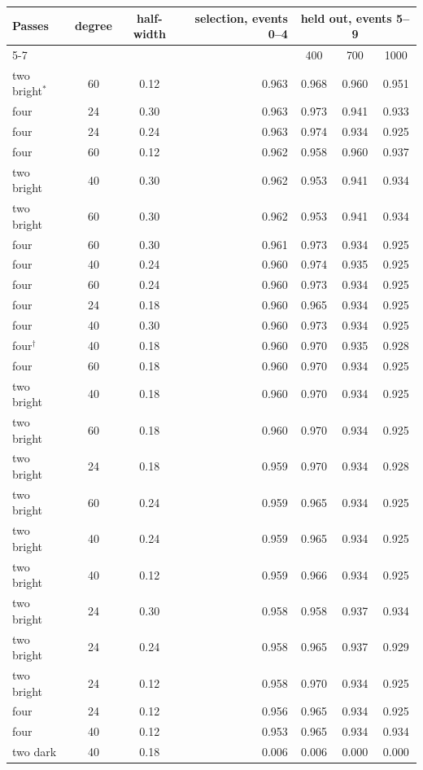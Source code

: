\begin{tabular}{lccrccc}\toprule
Passes & degree & half-width & selection, events 0--4 & \multicolumn{3}{c}{held out, events 5--9}\\
\cmidrule(lr){5-7}
 & & & & 400 & 700 & 1000\\\midrule
two bright$^\ast$ & 60 & 0.12 & 0.963 & 0.968 & 0.960 & 0.951\\
four & 24 & 0.30 & 0.963 & 0.973 & 0.941 & 0.933\\
four & 24 & 0.24 & 0.963 & 0.974 & 0.934 & 0.925\\
four & 60 & 0.12 & 0.962 & 0.958 & 0.960 & 0.937\\
two bright & 40 & 0.30 & 0.962 & 0.953 & 0.941 & 0.934\\
two bright & 60 & 0.30 & 0.962 & 0.953 & 0.941 & 0.934\\
four & 60 & 0.30 & 0.961 & 0.973 & 0.934 & 0.925\\
four & 40 & 0.24 & 0.960 & 0.974 & 0.935 & 0.925\\
four & 60 & 0.24 & 0.960 & 0.973 & 0.934 & 0.925\\
four & 24 & 0.18 & 0.960 & 0.965 & 0.934 & 0.925\\
four & 40 & 0.30 & 0.960 & 0.973 & 0.934 & 0.925\\
four$^\dagger$ & 40 & 0.18 & 0.960 & 0.970 & 0.935 & 0.928\\
four & 60 & 0.18 & 0.960 & 0.970 & 0.934 & 0.925\\
two bright & 40 & 0.18 & 0.960 & 0.970 & 0.934 & 0.925\\
two bright & 60 & 0.18 & 0.960 & 0.970 & 0.934 & 0.925\\
two bright & 24 & 0.18 & 0.959 & 0.970 & 0.934 & 0.928\\
two bright & 60 & 0.24 & 0.959 & 0.965 & 0.934 & 0.925\\
two bright & 40 & 0.24 & 0.959 & 0.965 & 0.934 & 0.925\\
two bright & 40 & 0.12 & 0.959 & 0.966 & 0.934 & 0.925\\
two bright & 24 & 0.30 & 0.958 & 0.958 & 0.937 & 0.934\\
two bright & 24 & 0.24 & 0.958 & 0.965 & 0.937 & 0.929\\
two bright & 24 & 0.12 & 0.958 & 0.970 & 0.934 & 0.925\\
four & 24 & 0.12 & 0.956 & 0.965 & 0.934 & 0.925\\
four & 40 & 0.12 & 0.953 & 0.965 & 0.934 & 0.934\\
two dark & 40 & 0.18 & 0.006 & 0.006 & 0.000 & 0.000\\
\bottomrule
\end{tabular}
